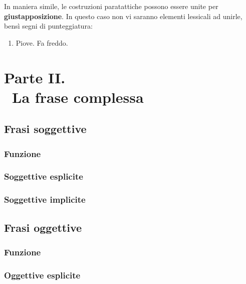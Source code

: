 \documentclass[a4paper,twoside,11pt,chapterprefix=false,bibliography=totocnumbered,listof=flat]{scrbook}
\providecommand{\tightlist}{%
  \setlength{\itemsep}{0pt}\setlength{\parskip}{0pt}}
\begin{document}
In maniera simile, le costruzioni paratattiche possono essere unite per \textbf{giustapposizione}. In questo caso non vi saranno elementi lessicali ad unirle, bensì segni di punteggiatura:

\begin{enumerate}
\def\labelenumi{(\arabic{enumi})}
\setcounter{enumi}{14}
\tightlist
\item
  Piove. Fa freddo.
\end{enumerate}

\part*{Parte II. \\\ La frase complessa}

\hypertarget{frasi-soggettive}{%
\chapter{Frasi soggettive}\label{frasi-soggettive}}

\hypertarget{funzione}{%
\section{Funzione}\label{funzione}}

\hypertarget{soggettive-esplicite}{%
\section{Soggettive esplicite}\label{soggettive-esplicite}}

\hypertarget{soggettive-implicite}{%
\section{Soggettive implicite}\label{soggettive-implicite}}

\hypertarget{frasi-oggettive}{%
\chapter{Frasi oggettive}\label{frasi-oggettive}}

\hypertarget{funzione-1}{%
\section{Funzione}\label{funzione-1}}

\hypertarget{oggettive-esplicite}{%
\section{Oggettive esplicite}\label{oggettive-esplicite}}
\end{document}
